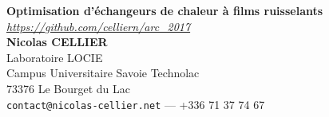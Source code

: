 \documentclass[a0,portrait]{a0poster}
\begin{document}


\begin{minipage}[b]{0.5\linewidth}
\veryHuge \color{NavyBlue} \textbf{Optimisation d'échangeurs de chaleur à films ruisselants} \color{Black}\\ %
\large \textit{\url{https://github.com/celliern/arc_2017}}\\[1cm] %

\huge \textbf{Nicolas CELLIER}\\[0.5cm] %
\huge Laboratoire LOCIE\\
Campus Universitaire Savoie Technolac\\
73376 Le Bourget du Lac\\[0.4cm] %
\Large \texttt{contact@nicolas-cellier.net} --- +336 71 37 74 67\\
\end{minipage}
%
\end{document}
